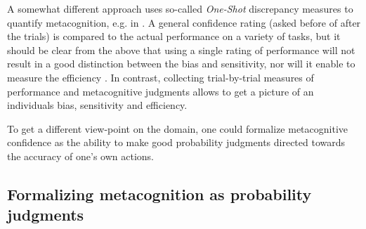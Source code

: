 \documentclass[../main/main.tex]{subfiles}
\begin{document}
	A somewhat different approach uses so-called \textit{One-Shot} discrepancy measures to quantify metacognition, e.g. in \citep{kruger1999unskilled}. A general confidence rating (asked before of after the trials) is compared to the actual performance on a variety of tasks, but it should be clear from the above that using a single rating of performance will not result in a good distinction between the bias and sensitivity, nor will it enable to measure the efficiency \citep{fleming2014measure}. In contrast, collecting trial-by-trial measures of performance and metacognitive judgments allows to get a picture of an individuals bias, sensitivity and efficiency.
	
	To get a different view-point on the domain, one could formalize metacognitive confidence as the ability to make good probability judgments directed towards the accuracy of one's own actions.
	
	\subsection{Formalizing metacognition as probability judgments}
	
\end{document}

